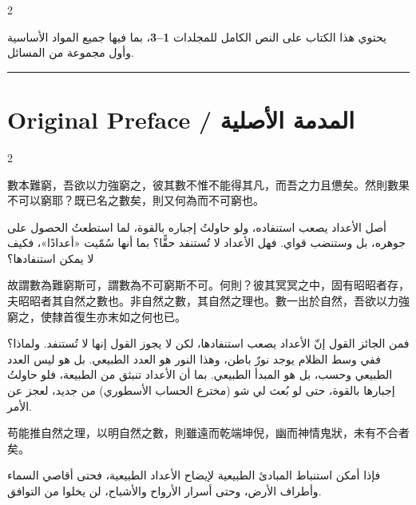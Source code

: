 \documentclass[11pt,a4paper]{article}
\newcommand{\ar}[1]{\arabicfont\beginR #1\endR}
\begin{document}
\begin{paracol}{2}
\vspace{0.3cm}

\ar{يحتوي هذا الكتاب على النص الكامل للمجلدات \textbf{1–3}، بما فيها جميع المواد الأساسية وأول مجموعة من المسائل.}

\end{paracol}

\vspace{0.5cm}
\noindent\textcolor{rulecolor}{\rule{\textwidth}{0.4pt}}

\newpage
\section{Original Preface / \ar{المدمة الأصلية}}
\label{sec:preface}

\begin{paracol}{2}

{\color{prefacecolor}
數本難窮，吾欲以力強窮之，彼其數不惟不能得其凡，而吾之力且憊矣。然則數果不可以窮耶？既已名之數矣，則又何為而不可窮也。
}

\vspace{0.3cm}

\switchcolumn

\ar{أصل الأعداد يصعب استنفاده، ولو حاولتُ إجباره بالقوة، لما استطعتُ الحصول على جوهره، بل وستنضب قواي. فهل الأعداد لا تُستنفد حقًّا؟ بما أنها سُمّيت «أعدادًا»، فكيف لا يمكن استنفادها؟}

\switchcolumn*

{\color{prefacecolor}
故謂數為難窮斯可，謂數為不可窮斯不可。何則？彼其冥冥之中，固有昭昭者存，夫昭昭者其自然之數也。非自然之數，其自然之理也。數一出於自然，吾欲以力強窮之，使隸首復生亦末如之何也已。
}

\switchcolumn

\ar{فمن الجائز القول إنّ الأعداد يصعب استنفادها، لكن لا يجوز القول إنها لا تُستنفد. ولماذا؟ ففي وسط الظلام يوجد نورٌ باطن، وهذا النور هو العدد الطبيعي. بل هو ليس العدد الطبيعي وحسب، بل هو المبدأ الطبيعي. بما أن الأعداد تنبثق من الطبيعة، فلو حاولتُ إجبارها بالقوة، حتى لو بُعث لي شو (مخترع الحساب الأسطوري) من جديد، لعجز عن الأمر.}

\switchcolumn*

{\color{prefacecolor}
苟能推自然之理，以明自然之數，則雖遠而乾端坤倪，幽而神情鬼狀，未有不合者矣。
}

\switchcolumn

\ar{فإذا أمكن استنباط المبادئ الطبيعية لإيضاح الأعداد الطبيعية، فحتى أقاصي السماء وأطراف الأرض، وحتى أسرار الأرواح والأشباح، لن يخلوا من التوافق.}


\end{paracol}
\end{document}
